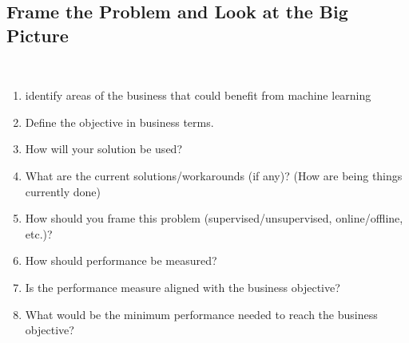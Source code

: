\documentclass[openany]{book}
\begin{document}
\subsection{Frame the Problem and Look at the Big Picture} \\

\begin{enumerate}
    \item identify areas of the business that could benefit from machine learning 
    \item Define the objective in business terms. 
    
    \item How will your solution be used?
    \item  What are the current solutions/workarounds (if any)? (How are being things currently done)
    
    \item How should you frame this problem (supervised/unsupervised, online/offline, etc.)?
    
    \item How should performance be measured?
    
    \item Is the performance measure aligned with the business objective? 
    
    \item What would be the minimum performance needed to reach the business objective?
    

\end{enumerate}
\end{document}
